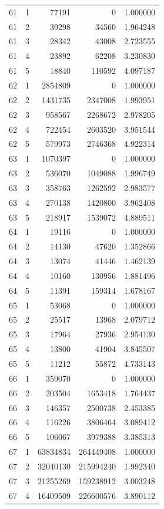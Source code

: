 \begin{longtable}{rrrrr}
61 & 1 & 77191 & 0 & 1.000000 \\
61 & 2 & 39298 & 34560 & 1.964248 \\
61 & 3 & 28342 & 43008 & 2.723555 \\
61 & 4 & 23892 & 62208 & 3.230830 \\
61 & 5 & 18840 & 110592 & 4.097187 \\
62 & 1 & 2854809 & 0 & 1.000000 \\
62 & 2 & 1431735 & 2347008 & 1.993951 \\
62 & 3 & 958567 & 2268672 & 2.978205 \\
62 & 4 & 722454 & 2603520 & 3.951544 \\
62 & 5 & 579973 & 2746368 & 4.922314 \\
63 & 1 & 1070397 & 0 & 1.000000 \\
63 & 2 & 536070 & 1049088 & 1.996749 \\
63 & 3 & 358763 & 1262592 & 2.983577 \\
63 & 4 & 270138 & 1420800 & 3.962408 \\
63 & 5 & 218917 & 1539072 & 4.889511 \\
64 & 1 & 19116 & 0 & 1.000000 \\
64 & 2 & 14130 & 47620 & 1.352866 \\
64 & 3 & 13074 & 41446 & 1.462139 \\
64 & 4 & 10160 & 130956 & 1.881496 \\
64 & 5 & 11391 & 159314 & 1.678167 \\
65 & 1 & 53068 & 0 & 1.000000 \\
65 & 2 & 25517 & 13968 & 2.079712 \\
65 & 3 & 17964 & 27936 & 2.954130 \\
65 & 4 & 13800 & 41904 & 3.845507 \\
65 & 5 & 11212 & 55872 & 4.733143 \\
66 & 1 & 359070 & 0 & 1.000000 \\
66 & 2 & 203504 & 1653418 & 1.764437 \\
66 & 3 & 146357 & 2500738 & 2.453385 \\
66 & 4 & 116226 & 3806464 & 3.089412 \\
66 & 5 & 106067 & 3979388 & 3.385313 \\
67 & 1 & 63834834 & 264449408 & 1.000000 \\
67 & 2 & 32040130 & 215994240 & 1.992340 \\
67 & 3 & 21255269 & 159238912 & 3.003248 \\
67 & 4 & 16409509 & 226600576 & 3.890112 \\

\end{longtable}
